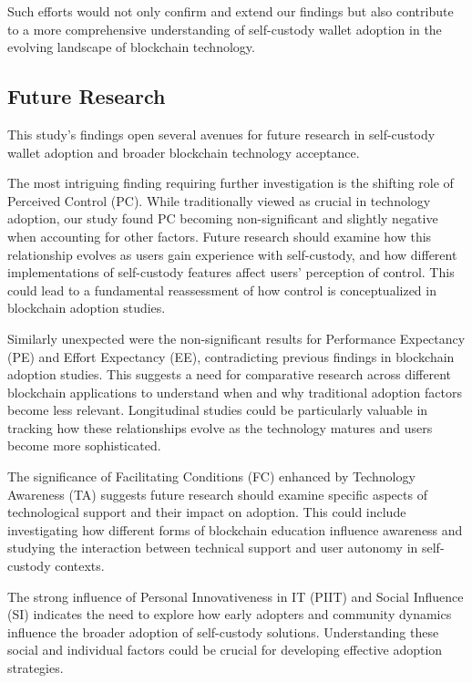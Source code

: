 \documentclass[twocolumn]{article}
\begin{document}
Such efforts would not only confirm and extend our findings but also contribute to a more comprehensive understanding of self-custody wallet adoption in the evolving landscape of blockchain technology.

\subsection{Future Research}

This study's findings open several avenues for future research in self-custody wallet adoption and broader blockchain technology acceptance.

The most intriguing finding requiring further investigation is the shifting role of Perceived Control (PC). While traditionally viewed as crucial in technology adoption, our study found PC becoming non-significant and slightly negative when accounting for other factors. Future research should examine how this relationship evolves as users gain experience with self-custody, and how different implementations of self-custody features affect users' perception of control. This could lead to a fundamental reassessment of how control is conceptualized in blockchain adoption studies.

Similarly unexpected were the non-significant results for Performance Expectancy (PE) and Effort Expectancy (EE), contradicting previous findings in blockchain adoption studies. This suggests a need for comparative research across different blockchain applications to understand when and why traditional adoption factors become less relevant. Longitudinal studies could be particularly valuable in tracking how these relationships evolve as the technology matures and users become more sophisticated.

The significance of Facilitating Conditions (FC) enhanced by Technology Awareness (TA) suggests future research should examine specific aspects of technological support and their impact on adoption. This could include investigating how different forms of blockchain education influence awareness and studying the interaction between technical support and user autonomy in self-custody contexts.

The strong influence of Personal Innovativeness in IT (PIIT) and Social Influence (SI) indicates the need to explore how early adopters and community dynamics influence the broader adoption of self-custody solutions. Understanding these social and individual factors could be crucial for developing effective adoption strategies.
\end{document}
